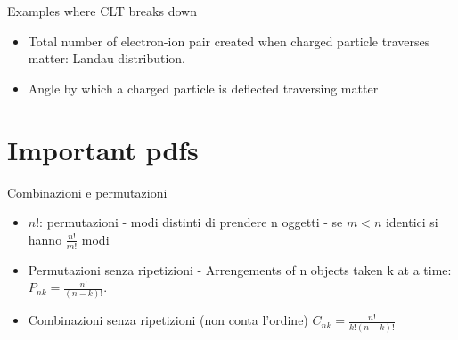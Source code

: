 \documentclass[asd-beamer.tex]{subfiles}%
\begin{document}
\begin{frame}{Examples where CLT breaks down}
\begin{itemize}
\item Total number of electron-ion pair created when charged particle traverses matter: Landau distribution.
\item Angle by which a charged particle is deflected traversing matter
\end{itemize}
\end{frame}

\section{Important pdfs}

\begin{wordonframe}{Combinazioni e permutazioni}
\begin{itemize}
\item $n!$: permutazioni - modi distinti di prendere n oggetti - se $m<n$ identici si hanno $\frac{n!}{m!}$ modi
\item Permutazioni senza ripetizioni - Arrengements of n objects taken k at a time: $P_{nk}=\frac{n!}{(n-k)!}$.
\item Combinazioni senza ripetizioni (non conta l'ordine) $C_{nk}=\frac{n!}{k!(n-k)!}$
\end{itemize}
\end{wordonframe}
\end{document}
